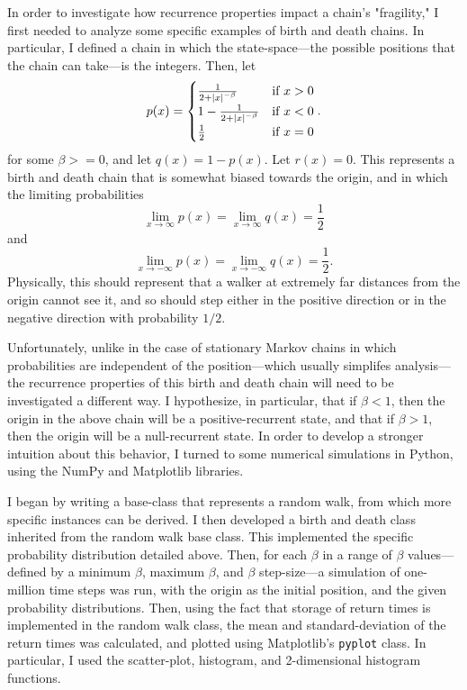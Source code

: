 In order to investigate how recurrence properties impact a chain's "fragility," I first needed to
analyze some specific examples of birth and death chains. In particular, I defined a chain in which the
state-space---the possible positions that the chain can take---is the integers. Then, let
\[
    p(x) = \begin{cases}
        \frac{1}{2+\left\vert x \right\vert^{-\beta}} & \text{if } x > 0 \\
        1 - \frac{1}{2+\left\vert x \right\vert^{-\beta}} & \text{if } x < 0 \\
        \frac{1}{2} & \text{if } x = 0
    \end{cases}.
\]
for some $\beta >= 0$, and let $q(x) = 1 - p(x)$. Let $r(x) = 0$. This represents a birth and death
chain that is somewhat biased towards the origin, and in which the limiting probabilities
\[
    \lim_{x \to \infty} p(x) = \lim_{x \to \infty} q(x) = \frac{1}{2}  
\]
and
\[
    \lim_{x \to -\infty} p(x) = \lim_{x \to -\infty} q(x) = \frac{1}{2}.  
\]
Physically, this should represent that a walker at extremely far distances from the origin cannot see
it, and so should step either in the positive direction or in the negative direction with probability
$1/2$.

Unfortunately, unlike in the case of stationary Markov chains in which probabilities are independent of
the position---which usually simplifes analysis---the recurrence properties of this birth and death
chain will need to be investigated a different way. I hypothesize, in particular, that if $\beta < 1$,
then the origin in the above chain will be a positive-recurrent state, and that if $\beta > 1$, then the
origin will be a null-recurrent state. In order to develop a stronger intuition about this behavior, I
turned to some numerical simulations in Python, using the NumPy and Matplotlib libraries.

I began by writing a base-class that represents a random walk, from which more specific instances can be
derived. I then developed a birth and death class inherited from the random walk base class. This
implemented the specific probability distribution detailed above. Then, for each $\beta$ in a range of
$\beta$ values---defined by a minimum $\beta$, maximum $\beta$, and $\beta$ step-size---a simulation of
one-million time steps was run, with the origin as the initial position, and the given probability
distributions. Then, using the fact that storage of return times is implemented in the random walk
class, the mean and standard-deviation of the return times was calculated, and plotted using
Matplotlib's \texttt{pyplot} class. In particular, I used the scatter-plot, histogram, and
2-dimensional histogram functions.

